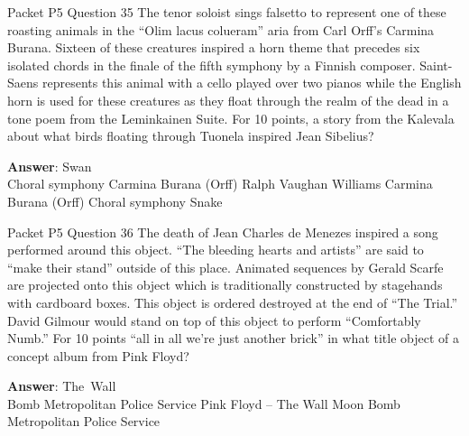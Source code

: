 \begin{frame}{Packet P5 Question 35}
The tenor soloist sings   falsetto to represent   one of these roasting animals in the “Olim lacus colueram” aria from Carl Orff’s Carmina Burana. Sixteen of these creatures inspired a horn theme that precedes six isolated chords in the finale of the fifth symphony by a Finnish composer. Saint-Saens represents this animal with a cello played over two pianos while the English horn is used for these creatures as they float through the realm of the dead in a tone poem from the Leminkainen Suite. For 10 points, a story from the Kalevala about what birds floating through Tuonela inspired Jean Sibelius?        

\textbf{Answer}: Swan\\
 Choral symphony
 Carmina Burana (Orff)
 Ralph Vaughan Williams
 Carmina Burana (Orff)
 Choral symphony
 Snake
\end{frame}

\begin{frame}{Packet P5 Question 36}
The death of Jean Charles de Menezes inspired     a song performed around this object. “The bleeding hearts and artists” are said to “make their stand” outside of this place. Animated sequences by Gerald Scarfe are projected onto this object which is traditionally constructed by stagehands with cardboard boxes. This object is ordered destroyed at the end of “The Trial.” David Gilmour would stand on top of this object to perform “Comfortably Numb.” For 10 points “all in all we’re just another brick” in what title object of a concept album from Pink Floyd?        

\textbf{Answer}: The\ Wall\\
 Bomb
 Metropolitan Police Service
 Pink Floyd – The Wall
 Moon
 Bomb
 Metropolitan Police Service
\end{frame}


